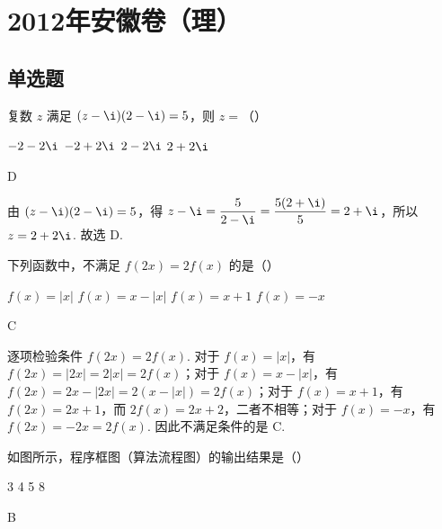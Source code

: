 \chapter{2012年安徽卷（理）}

\section{单选题}

\begin{problem}
复数 \(z\) 满足 \((z - \i)(2 - \i) = 5\)，则 \(z =\)（\quad）

\choices
    {\(-2 - 2\i\)}
    {\(-2 + 2\i\)}
    {\(2 - 2\i\)}
    {\(2 + 2\i\)}
\end{problem}

\begin{answer}
D
\end{answer}

\begin{solution}
由 \((z-\i)(2-\i)=5\)，得
\(z-\i=\dfrac{5}{2-\i}=\dfrac{5(2+\i)}{5}=2+\i\)，所以 \(z=2+2\i\). 故选 D.
\end{solution}

\begin{problem}
下列函数中，不满足 \( f(2x) = 2f(x) \) 的是（\quad）

\choices
    {\(f(x) = |x|\)}
    {\(f(x) = x - |x|\)}
    {\(f(x) = x + 1\)}
    {\(f(x) = -x\)}
\end{problem}

\begin{answer}
C
\end{answer}

\begin{solution}
逐项检验条件 \(f(2x)=2f(x)\). 对于 \(f(x)=|x|\)，有 \(f(2x)=|2x|=2|x|=2f(x)\)；对于 \(f(x)=x-|x|\)，有 \(f(2x)=2x-|2x|=2(x-|x|)=2f(x)\)；对于 \(f(x)=x+1\)，有 \(f(2x)=2x+1\)，而 \(2f(x)=2x+2\)，二者不相等；对于 \(f(x)=-x\)，有 \(f(2x)=-2x=2f(x)\). 因此不满足条件的是 C.
\end{solution}

\begin{problem}
如图所示，程序框图（算法流程图）的输出结果是（\quad）


\choices
    {3}
    {4}
    {5}
    {8}
\end{problem}

\begin{answer}
B
\end{answer}

